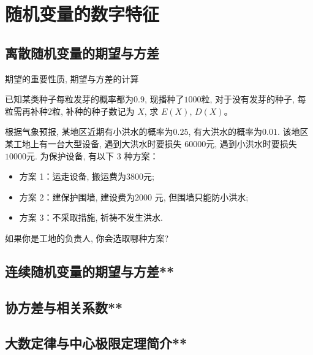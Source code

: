
\section{随机变量的数字特征}
\subsection{离散随机变量的期望与方差}
期望的重要性质, 期望与方差的计算


\begin{example}
    已知某类种子每粒发芽的概率都为$ 0.9$, 现播种了$ 1000 $粒, 对于没有发芽的种子,
     每粒需再补种$ 2 $粒, 补种的种子数记为 $X$, 求 $E(X)$, $D(X)$。
\end{example}





\begin{example}
    根据气象预报, 某地区近期有小洪水的概率为$ 0.25$, 
    有大洪水的概率为$ 0.01$.
     该地区某工地上有一台大型设备, 
     遇到大洪水时要损失 $60 000 $元, 遇到小洪水时要损失$ 10 000 $元. 
     为保护设备, 有以下 3 种方案：

\begin{itemize}
    \setlength{\itemsep}{-\itemsep}
    \item 方案 1：运走设备, 搬运费为$ 3 800 $元;
    \item 方案 2：建保护围墙, 建设费为$ 2 000$ 元, 但围墙只能防小洪水; 
    \item 方案 3：不采取措施, 祈祷不发生洪水. 
\end{itemize}
如果你是工地的负责人, 你会选取哪种方案?
\end{example}
\clearpage
\subsection{连续随机变量的期望与方差**}
\clearpage
\subsection{协方差与相关系数**}
\clearpage
\subsection{大数定律与中心极限定理简介**}
\clearpage
